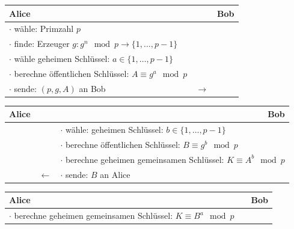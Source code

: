 \documentclass[utf8]{beamer}
\begin{document}
\begin{frame}{\insertsubsectionhead}
  \begin{center}
    \begin{tabularx}{\textwidth}{Xcl}
      \textbf{Alice} & & \textbf{Bob}\\\midrule
      $\cdot$ wähle: Primzahl $p$\\
      $\cdot$ finde: Erzeuger $g: g^n \mod p \to \{1, \ldots, p-1\}$\\
      $\cdot$ wähle geheimen Schlüssel: $a \in \{1, \ldots, p-1\}$\\
      $\cdot$ berechne öffentlichen Schlüssel: $A \equiv g^a \mod p$\\
      $\cdot$ sende: $(p, g, A)$ an Bob & $\to$
    \end{tabularx}
  \end{center}

  \pause

  \begin{center}
    \begin{tabularx}{\textwidth}{lcX}
      \textbf{Alice} &  & \multicolumn{1}{r}{\textbf{Bob}}\\\midrule
      & & $\cdot$ wähle: geheimen Schlüssel: $b\in \{ 1 ,\ldots , p - 1 \}$\\
      & & $\cdot$ berechne öffentlichen Schlüssel: $B \equiv g^b \mod p$\\
      & & $\cdot$ berechne geheimen gemeinsamen Schlüssel: $K \equiv A^b \mod p$\\
      & $\leftarrow$ & $\cdot$ sende: $B$ an Alice
    \end{tabularx}
  \end{center}

  \pause

  \begin{center}
    \begin{tabularx}{\textwidth}{Xcl}
      \textbf{Alice} &  & \textbf{Bob}\\\midrule
      $\cdot$ berechne geheimen gemeinsamen Schlüssel: $K \equiv B^a \mod p$
    \end{tabularx}
  \end{center}
\end{frame}
\end{document}
